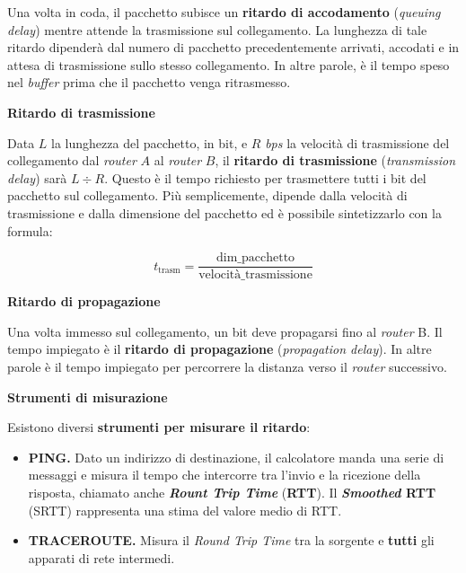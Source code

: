 \documentclass[a4paper]{article}
\begin{document}
	\noindent
	Una volta in coda, il pacchetto subisce un \textbf{ritardo di accodamento} (\emph{queuing delay}) mentre attende la trasmissione sul collegamento. La lunghezza di tale ritardo dipenderà dal numero di pacchetto precedentemente arrivati, accodati e in attesa di trasmissione sullo stesso collegamento. In altre parole, è il tempo speso nel \emph{buffer} prima che il pacchetto venga ritrasmesso.
	
	\begin{flushleft}
		\large \textcolor{Red3}{\textbf{Ritardo di trasmissione}}
	\end{flushleft}
	
	\noindent
	Data $L$ la lunghezza del pacchetto, in bit, e $R$ \emph{bps} la velocità di trasmissione del collegamento dal \emph{router} $A$ al \emph{router} $B$, il \textbf{ritardo di trasmissione} (\emph{transmission delay}) sarà $L\div R$. Questo è il tempo richiesto per trasmettere tutti i bit del pacchetto sul collegamento.\newline
	Più semplicemente, dipende dalla velocità di trasmissione e dalla dimensione del pacchetto ed è possibile sintetizzarlo con la formula:
	
	\begin{equation*}
		t_{\text{trasm}} = \dfrac{\text{dim\_pacchetto}}{\text{velocità\_trasmissione}}
	\end{equation*}
	
	\begin{flushleft}
	\large \textcolor{Red3}{\textbf{Ritardo di propagazione}}
	\end{flushleft}
	
	\noindent
	Una volta immesso sul collegamento, un bit deve propagarsi fino al \emph{router} B. Il tempo impiegato è il \textbf{ritardo di propagazione} (\emph{propagation delay}). In altre parole è il tempo impiegato per percorrere la distanza verso il \emph{router} successivo.
	
	\begin{flushleft}
		\large \textbf{Strumenti di misurazione}
	\end{flushleft}
	
	\noindent
	Esistono diversi \textbf{strumenti per misurare il ritardo}:
	
	\begin{itemize}
		\item \textbf{PING.} Dato un indirizzo di destinazione, il calcolatore manda una serie di messaggi e misura il tempo che intercorre tra l'invio e la ricezione della risposta, chiamato anche \textbf{\emph{Rount Trip Time}} (\textbf{RTT}). Il \textbf{\emph{Smoothed} RTT} (SRTT) rappresenta una stima del valore medio di RTT.
		
		\item \textbf{TRACEROUTE.} Misura il \emph{Round Trip Time} tra la sorgente e \textbf{tutti} gli apparati di rete intermedi.
	\end{itemize}
	
\end{document}

